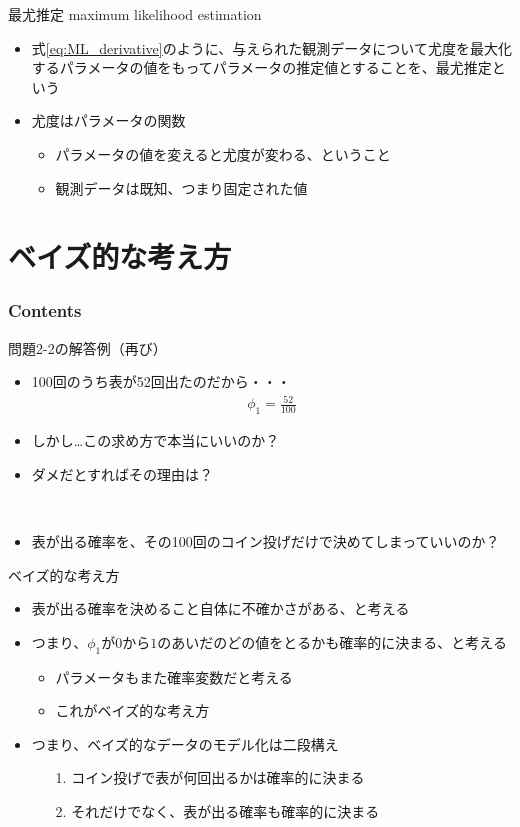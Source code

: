 \documentclass[aspectratio=169,unicode,dvipdfmx,14pt]{beamer}
\begin{document}
\begin{frame}{最尤推定 maximum likelihood estimation}
\begin{itemize}
\item 式\eqref{eq:ML_derivative}のように、与えられた観測データについて尤度を最大化するパラメータの値をもってパラメータの推定値とすることを、最尤推定という
\item 尤度はパラメータの関数
\begin{itemize}
\item パラメータの値を変えると尤度が変わる、ということ
\item 観測データは既知、つまり固定された値
\end{itemize}
\end{itemize}
\end{frame}

\section{ベイズ的な考え方}

\begin{frame}\frametitle{Contents}
\Large \tableofcontents[currentsection]
\end{frame}

\begin{frame}{問題2-2の解答例（再び）}
\begin{itemize}
\item 100回のうち表が52回出たのだから・・・
\begin{align}
\phi_1 = \frac{52}{100}
\end{align}
\item しかし…この求め方で本当にいいのか？
\item ダメだとすればその理由は？
\item[] \
\item 表が出る確率を、その100回のコイン投げだけで決めてしまっていいのか？
\end{itemize}
\end{frame}

\begin{frame}{ベイズ的な考え方}
\begin{itemize}
\item 表が出る確率を決めること自体に不確かさがある、と考える
\item つまり、$\phi_1$が$0$から$1$のあいだのどの値をとるかも確率的に決まる、と考える
\begin{itemize}
\item パラメータもまた確率変数だと考える
\item これがベイズ的な考え方
\end{itemize}
\item つまり、ベイズ的なデータのモデル化は二段構え
\begin{itemize}
\item[1.] コイン投げで表が何回出るかは確率的に決まる
\item[2.] それだけでなく、表が出る確率も確率的に決まる
\end{itemize}
\end{itemize}
\end{frame}
\end{document}
